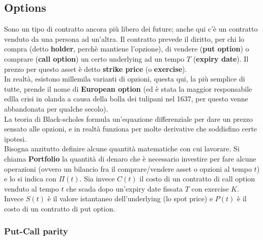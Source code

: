 \documentclass[a4paper,12pt]{article}
\theoremstyle{plain}
\theoremstyle{definition}
\theoremstyle{remark}
\begin{document}
\subsection{Options}
Sono un tipo di contratto ancora più libero dei future; anche qui c'è un contratto venduto da una persona ad un'altra. Il contratto prevede il diritto, per chi lo compra (detto \textbf{holder}, perchè mantiene l'opzione), di vendere (\textbf{put option}) o comprare (\textbf{call option}) un certo underlying ad un tempo $T$ (\textbf{expiry date}). Il prezzo per questo asset è detto \textbf{strike price} (o \textbf{exercise}).\\In realtà, esistono millemila varianti di opzioni, questa qui, la più semplice di tutte, prende il nome di \textbf{European option} (ed è stata la maggior responsabile edlla crisi in olanda a causa della bolla dei tulipani nel 1637, per questo venne abbandonata per qualche secolo).
\\La teoria di Black-scholes formula un'equazione differenziale per dare un prezzo sensato alle opzioni, e in realtà funziona per molte derivative che soddisfino certe ipotesi.\\
Bisogna anzitutto definire alcune quantità matematiche con cui lavorare. Si chiama \textbf{Portfolio} la quantità di denaro che è necessario investire per fare alcune operazioni (ovvero un bilancio fra il comprare/vendere asset o opzioni al tempo $t$) e lo si indica con $\Pi(t)$.
Sia invece $C(t)$ il costo di un contratto di call option venduto al tempo $t$ che scada dopo un'expiry date fissata $T$ con exercise $K$. Invece $S(t)$ è il valore istantaneo dell'underlying (lo spot price) e $P(t)$ è il costo di un contratto di put option.


	
\subsubsection{Put-Call parity}
\end{document}
